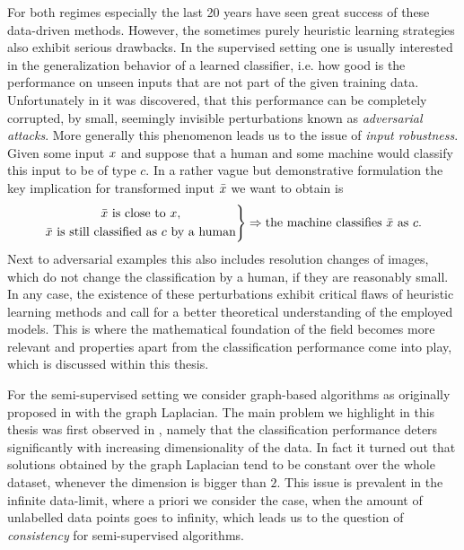 For both regimes especially the last 20 years have seen great success of these data-driven methods. However, the sometimes purely heuristic learning strategies also exhibit serious drawbacks. In the supervised setting one is usually interested in the generalization behavior of a learned classifier, i.e. how good is the performance on unseen inputs that are not part of the given training data. Unfortunately in \cite{goodfellow2014explaining} it was discovered, that this performance can be completely corrupted, by small, seemingly invisible perturbations known as \textit{adversarial attacks}. More generally this phenomenon leads us to the issue of \textit{input robustness}. Given some input $x$ and suppose that a human and some machine would classify this input to be of type $c$. In a rather vague but demonstrative formulation the key implication for transformed input $\bar{x}$ we want to obtain is
%
\begin{align*}
\left.
\begin{gathered}
\bar{x}\text{ is close to }x,\\
\bar{x}\text{ is still classified as }c\text{ by a human}
\end{gathered}
\right\}
\Rightarrow
\text{the machine classifies }\bar{x}\text{ as } c. 
\end{align*}
%
Next to adversarial examples this also includes resolution changes of images, which do not change the classification by a human, if they are reasonably small. In any case, the existence of these perturbations exhibit critical flaws of heuristic learning methods and call for a better theoretical understanding of the employed models. This is where the mathematical foundation of the field becomes more relevant and properties apart from the classification performance come into play, which is discussed within this thesis.

For the semi-supervised setting we consider graph-based algorithms as originally proposed in \cite{zhu2003semi} with the graph Laplacian. The main problem we highlight in this thesis was first observed in \cite{nadler2009statistical}, namely that the classification performance deters significantly with increasing dimensionality of the data. In fact it turned out that solutions obtained by the graph Laplacian tend to be constant over the whole dataset, whenever the dimension is bigger than $2$. This issue is prevalent in the infinite data-limit, where a priori we consider the case, when the amount of unlabelled data points goes to infinity, which leads us to the question of \textit{consistency} for semi-supervised algorithms.

